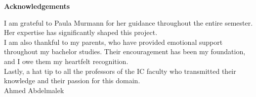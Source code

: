 
\thispagestyle{empty} %
\begin{center}
    \Large \textbf{Acknowledgements}\\[2cm]
\end{center}

\linespread{1.3}\selectfont %

\noindent
I am grateful to Paula Murmann for her guidance throughout the entire semester. Her expertise has significantly shaped this project.\\

\noindent
I am also thankful to my parents, who have provided emotional support throughout my bachelor studies. Their encouragement has been my foundation, and I owe them my heartfelt recognition.\\

\noindent
Lastly, a hat tip to all the professors of the IC faculty who transmitted their knowledge and their passion for this domain.\\[2cm]

\hfill Ahmed Abdelmalek %